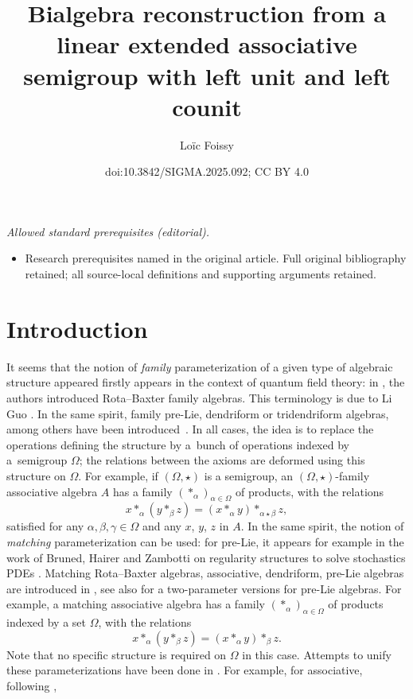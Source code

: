 \documentclass[10pt,a4paper]{amsart}
\title{Bialgebra reconstruction from a linear extended associative semigroup with left unit and left counit}
\author{Loïc Foissy}
\date{doi:10.3842/SIGMA.2025.092; CC BY 4.0}
\numberwithin{equation}{section}
\begin{document}
\maketitle
\noindent\textit{Allowed standard prerequisites (editorial).}\begin{itemize}
\item Research prerequisites named in the original article. Full original bibliography retained; all source-local definitions and supporting arguments retained.
\end{itemize}\medskip
\section{Introduction}

It seems that the notion of \emph{family} parameterization of a given type of algebraic structure appeared firstly appears in the context of quantum field theory:
in \cite{Ebrahimi-Fard2007}, the authors introduced Rota--Baxter family algebras. This terminology is due to Li Guo \cite{Guo2009}. In the same spirit, family pre-Lie, dendriform or tridendriform algebras, among others have been introduced~\cite{Foissy49,Zhang2019,Zhang2020,Zhang2020-3,Manchon2020}. In all cases, the idea is to replace the operations defining the structure by a~bunch of operations indexed by a~semigroup $\Omega$;
the relations between the axioms are deformed using this structure on $\Omega$.
For example, if $(\Omega,\star)$ is a semigroup, an $(\Omega,\star)$-family associative algebra $A$ has a family $(*_\alpha)_{\alpha \in \Omega}$ of products, with the relations
\[x*_\alpha (y *_\beta z)=( x*_\alpha y)*_{\alpha \star \beta}z,\]
satisfied for any $\alpha,\beta,\gamma \in \Omega$ and any $x$, $y$, $z$ in $A$. In the same spirit, the notion of \emph{matching} parameterization can be used: for pre-Lie, it appears for example in the work of Bruned, Hairer and Zambotti
on regularity structures to solve stochastics PDEs \cite{Bruned2019,Bruned2023,Bruned2023-1,Foissy47}.
Matching Rota--Baxter algebras, associative, dendriform, pre-Lie algebras are introduced in \cite{Foissy47,Zhang2020}, see also \cite{Foissy49} for a two-parameter versions for pre-Lie algebras.
For example, a matching associative algebra has a family $(*_\alpha)_{\alpha \in \Omega}$ of products indexed by a set $\Omega$, with the relations
\[x*_\alpha (y *_\beta z)=(x *_\alpha y)*_\beta z.\]
Note that no specific structure is required on $\Omega$ in this case.
Attempts to unify these parameterizations have been done in \cite{Foissy56,Foissy48,Foissy50}. For example, for associative, following \cite{Foissy56},
\end{document}
